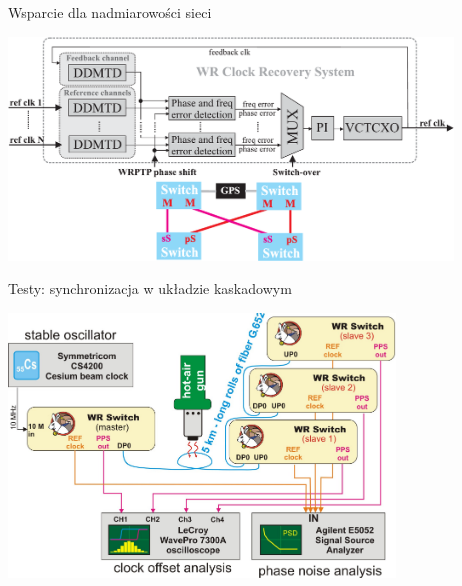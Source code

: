 \documentclass[compress,red]{beamer}
\begin{document}
\begin{frame}{Wsparcie dla nadmiarowości sieci}


  \begin{center}
  \includegraphics[width=11.8cm]{protocol/wrCRS_plus_mBMC.pdf}
  \end{center}

\end{frame}
\begin{frame}{Testy: synchronizacja w układzie kaskadowym}

    \begin{center}
    \includegraphics[height=7.0cm]{measurements/measSystem.pdf}
    \end{center}

\end{frame}
\end{document}
